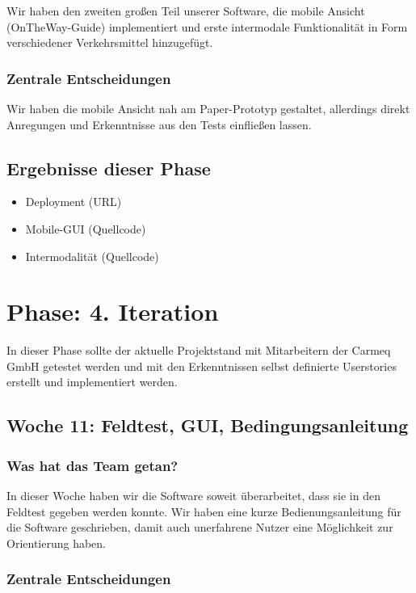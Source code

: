 \documentclass[12pt,a4paper]{article}
\begin{document}
Wir haben den zweiten gro\ss en Teil unserer Software, die mobile Ansicht (OnTheWay-Guide) implementiert und erste intermodale Funktionalit\"at in Form verschiedener Verkehrsmittel hinzugef\"ugt.

\subsubsection{Zentrale Entscheidungen}

Wir haben die mobile Ansicht nah am Paper-Prototyp gestaltet, allerdings direkt Anregungen und Erkenntnisse aus den Tests einflie\ss en lassen.

\subsection{Ergebnisse dieser Phase}

\begin{itemize}
\item Deployment (URL)
\item Mobile-GUI (Quellcode)
\item Intermodalit\"at (Quellcode)
\end{itemize}

\section{Phase: 4. Iteration}

In dieser Phase sollte der aktuelle Projektstand mit Mitarbeitern der Carmeq GmbH getestet werden und mit den Erkenntnissen selbst definierte Userstories erstellt und implementiert werden.

\subsection{Woche 11: Feldtest, GUI, Bedingungsanleitung}

\subsubsection{Was hat das Team getan?}

In dieser Woche haben wir die Software soweit \"uberarbeitet, dass sie in den Feldtest gegeben werden konnte. Wir haben eine kurze Bedienungsanleitung f\"ur die Software geschrieben, damit auch unerfahrene Nutzer eine M\"oglichkeit zur Orientierung haben.

\subsubsection{Zentrale Entscheidungen}
\end{document}
